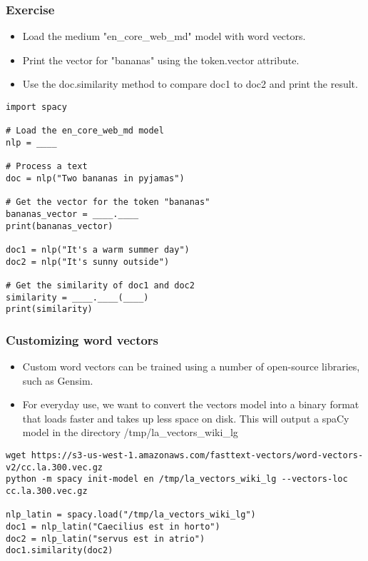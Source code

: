 \begin{frame}[fragile]\frametitle{Exercise}

\begin{itemize}
\item Load the medium "en\_core\_web\_md" model with word vectors.
\item Print the vector for "bananas" using the token.vector attribute.
\item Use the doc.similarity method to compare doc1 to doc2 and print the result.

\end{itemize}


\begin{lstlisting}
import spacy

# Load the en_core_web_md model
nlp = ____

# Process a text
doc = nlp("Two bananas in pyjamas")

# Get the vector for the token "bananas"
bananas_vector = ____.____
print(bananas_vector)

doc1 = nlp("It's a warm summer day")
doc2 = nlp("It's sunny outside")

# Get the similarity of doc1 and doc2
similarity = ____.____(____)
print(similarity)
\end{lstlisting}


\end{frame}


\begin{frame}[fragile]\frametitle{Customizing word vectors}

\begin{itemize}
\item Custom word vectors can be trained using a number of open-source libraries, such as Gensim.
\item For everyday use, we want to convert the vectors model into a binary format that loads faster and takes up less space on disk.
This will output a spaCy model in the directory /tmp/la\_vectors\_wiki\_lg
\end{itemize}

\begin{lstlisting}
wget https://s3-us-west-1.amazonaws.com/fasttext-vectors/word-vectors-v2/cc.la.300.vec.gz
python -m spacy init-model en /tmp/la_vectors_wiki_lg --vectors-loc cc.la.300.vec.gz

nlp_latin = spacy.load("/tmp/la_vectors_wiki_lg")
doc1 = nlp_latin("Caecilius est in horto")
doc2 = nlp_latin("servus est in atrio")
doc1.similarity(doc2)
\end{lstlisting}


\end{frame}

